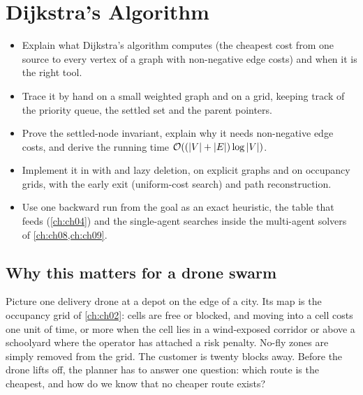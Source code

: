 \chapter{Dijkstra's Algorithm}
\label{ch:ch03}

\begin{objectives}
\begin{itemize}
  \item Explain what Dijkstra's algorithm computes (the cheapest cost from one source to every
vertex of a graph with non-negative edge costs) and when it is the right tool.
  \item Trace it by hand on a small weighted graph and on a grid, keeping track of the priority
queue, the settled set and the parent pointers.
  \item Prove the settled-node invariant, explain why it needs non-negative edge costs, and
derive the running time $\mathcal{O}\!\left((\left\lvert V \right\rvert+\left\lvert E \right\rvert)\log\left\lvert V \right\rvert\right)$.
  \item Implement it in \python with  and lazy deletion, on explicit graphs and on
occupancy grids, with the early exit (uniform-cost search) and path reconstruction.
  \item Use one backward run from the goal as an exact heuristic, the table that feeds \astar
(\cref{ch:ch04}) and the single-agent searches inside the multi-agent solvers of
\cref{ch:ch08,ch:ch09}.
\end{itemize}
\end{objectives}

\section{Why this matters for a drone swarm}
\label{sec:ch03-motivation}

Picture one delivery drone at a depot on the edge of a city. Its map is the occupancy grid of
\cref{ch:ch02}: cells are free or blocked, and moving into a cell costs one unit of time, or
more when the cell lies in a wind-exposed corridor or above a schoolyard where the operator has
attached a risk penalty. No-fly zones are simply removed from the grid. The customer is twenty
blocks away. Before the drone lifts off, the planner has to answer one question: which route is
the cheapest, and how do we know that no cheaper route exists?

